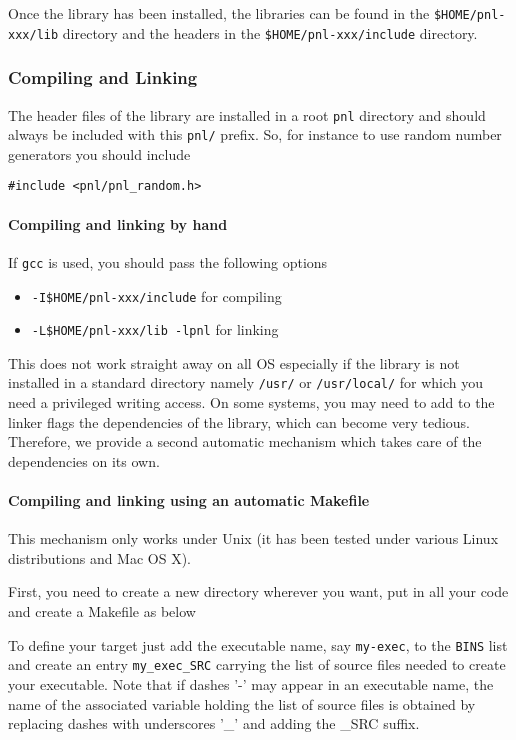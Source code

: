 \documentclass[a4paper,11pt,twoside]{article}
\begin{document}
Once the library has been installed, the libraries can be found in the
\verb!$HOME/pnl-xxx/lib!  directory and the headers in the
\verb!$HOME/pnl-xxx/include! directory. 

\subsubsection{Compiling and Linking}

The header files of the library are installed in a root \verb!pnl! directory and
should always be included with this \verb!pnl/! prefix. So, for instance to use
random number generators you should include 
\begin{verbatim}
#include <pnl/pnl_random.h>
\end{verbatim}

\paragraph{Compiling and linking by hand}

If \verb!gcc! is used, you should pass the following options
\begin{itemize}
\item \verb!-I$HOME/pnl-xxx/include! for compiling
\item \verb!-L$HOME/pnl-xxx/lib -lpnl! for linking
\end{itemize}
This does not work straight away on all OS especially if the library is not
installed in a standard directory namely \verb+/usr/+ or \verb+/usr/local/+ for
which you need a privileged writing access.
On some systems, you may need to add to the linker flags the dependencies of the
library, which can become very tedious. Therefore, we provide a second automatic
mechanism which takes care of the dependencies on its own.

\paragraph{Compiling and linking using an automatic Makefile}

This mechanism only works under Unix (it has been tested under various Linux
distributions and Mac OS X).

First, you need to create a new directory wherever you want, put in all your
code and create a Makefile as below

To define your target just add the executable name, say \verb!my-exec!, to the
\verb!BINS!  list and create an entry \verb!my_exec_SRC! carrying the list
of source files needed to create your executable.  Note that if dashes '-' may
appear in an executable name, the name of the associated variable holding the
list of source files is obtained by replacing dashes with underscores '_' and
adding the _SRC suffix.
\end{document}
